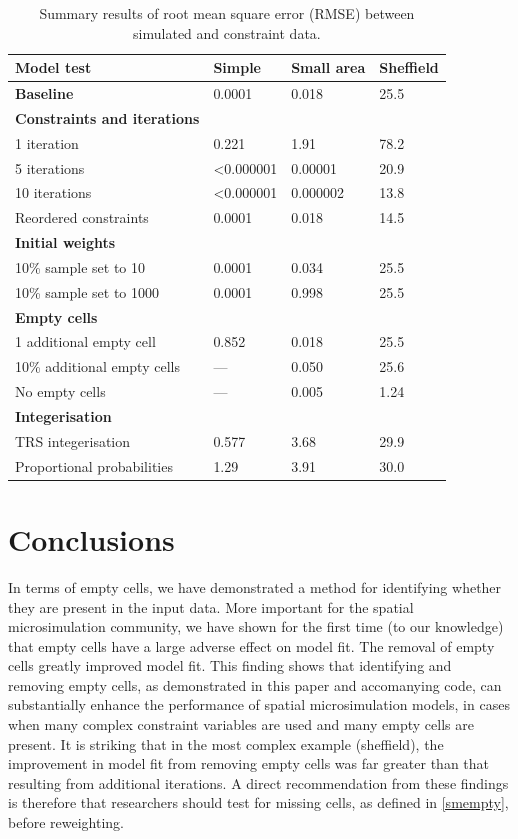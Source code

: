 \documentclass[a4paper,10pt]{article}
\begin{document}
\begin{table}[h]
\caption{Summary results of root mean square error (RMSE) between
simulated and constraint data.} \label{tsum}
\begin{center}
\begin{tabular}{llll}
\toprule
Model test & Simple & Small area  & Sheffield \\
\midrule
\textbf{Baseline} & 0.0001 & 0.018  & 25.5 \\
\midrule
\textbf{Constraints and iterations} &  &  & \\
1 iteration & 0.221 & 1.91 & 78.2 \\
5 iterations & \textless 0.000001 & 0.00001  & 20.9 \\
10 iterations & \textless 0.000001 & 0.000002  & 13.8 \\
Reordered constraints 		& 0.0001  & 0.018 & 14.5 \\ %
\midrule
\textbf{Initial weights} 	&  &  & \\
10\% sample set to 10  		& 0.0001 & 0.034  & 25.5\\
10\% sample set to 1000 	& 0.0001 & 0.998 & 25.5 \\
\midrule
\textbf{Empty cells} 		&  &  & \\
1 additional empty cell 	& 0.852 & 0.018  & 25.5 \\
10\% additional empty cells 	& --- & 0.050  & 25.6 \\
No empty cells			& --- & 0.005 & 1.24 \\
\midrule
\textbf{Integerisation} 	&  &  & \\
TRS integerisation				& 0.577 & 3.68  & 29.9 \\
Proportional probabilities & 1.29 & 3.91 & 30.0 \\
\bottomrule
\end{tabular}
\end{center}
\end{table}

\section{Conclusions}

In terms of empty cells, we have demonstrated a method for identifying
whether they are present in the input data. More important for the spatial microsimulation
community, we have shown for the first time (to our knowledge) that empty cells have a
large adverse effect on model fit. The removal of empty cells greatly improved model fit.
This finding shows that identifying and removing empty cells, as
demonstrated in this paper and accomanying code, can substantially enhance the performance of
spatial microsimulation models, in cases when many complex
constraint variables are used and many empty cells are present.
It is striking that in the most complex example (sheffield), the improvement in
model fit from removing empty cells was far greater than that resulting from
additional iterations.
A direct recommendation from these findings is therefore that researchers should
test for missing cells, as defined in \cref{smempty}, before reweighting. 
\end{document}
